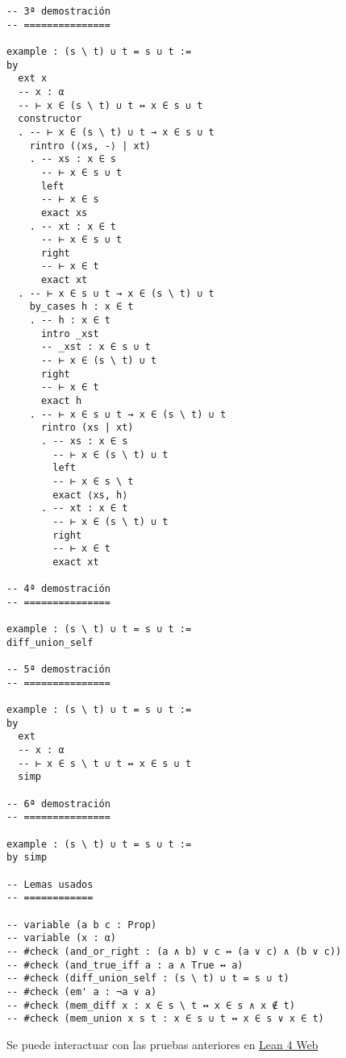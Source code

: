 \begin{verbatim}
-- 3ª demostración
-- ===============

example : (s \ t) ∪ t = s ∪ t :=
by
  ext x
  -- x : α
  -- ⊢ x ∈ (s \ t) ∪ t ↔ x ∈ s ∪ t
  constructor
  . -- ⊢ x ∈ (s \ t) ∪ t → x ∈ s ∪ t
    rintro (⟨xs, -⟩ | xt)
    . -- xs : x ∈ s
      -- ⊢ x ∈ s ∪ t
      left
      -- ⊢ x ∈ s
      exact xs
    . -- xt : x ∈ t
      -- ⊢ x ∈ s ∪ t
      right
      -- ⊢ x ∈ t
      exact xt
  . -- ⊢ x ∈ s ∪ t → x ∈ (s \ t) ∪ t
    by_cases h : x ∈ t
    . -- h : x ∈ t
      intro _xst
      -- _xst : x ∈ s ∪ t
      -- ⊢ x ∈ (s \ t) ∪ t
      right
      -- ⊢ x ∈ t
      exact h
    . -- ⊢ x ∈ s ∪ t → x ∈ (s \ t) ∪ t
      rintro (xs | xt)
      . -- xs : x ∈ s
        -- ⊢ x ∈ (s \ t) ∪ t
        left
        -- ⊢ x ∈ s \ t
        exact ⟨xs, h⟩
      . -- xt : x ∈ t
        -- ⊢ x ∈ (s \ t) ∪ t
        right
        -- ⊢ x ∈ t
        exact xt

-- 4ª demostración
-- ===============

example : (s \ t) ∪ t = s ∪ t :=
diff_union_self

-- 5ª demostración
-- ===============

example : (s \ t) ∪ t = s ∪ t :=
by
  ext
  -- x : α
  -- ⊢ x ∈ s \ t ∪ t ↔ x ∈ s ∪ t
  simp

-- 6ª demostración
-- ===============

example : (s \ t) ∪ t = s ∪ t :=
by simp

-- Lemas usados
-- ============

-- variable (a b c : Prop)
-- variable (x : α)
-- #check (and_or_right : (a ∧ b) ∨ c ↔ (a ∨ c) ∧ (b ∨ c))
-- #check (and_true_iff a : a ∧ True ↔ a)
-- #check (diff_union_self : (s \ t) ∪ t = s ∪ t)
-- #check (em' a : ¬a ∨ a)
-- #check (mem_diff x : x ∈ s \ t ↔ x ∈ s ∧ x ∉ t)
-- #check (mem_union x s t : x ∈ s ∪ t ↔ x ∈ s ∨ x ∈ t)
\end{verbatim}
Se puede interactuar con las pruebas anteriores en \href{https://lean.math.hhu.de/\#url=https://raw.githubusercontent.com/jaalonso/Calculemus2/main/src/Union\_con\_su\_diferencia.lean}{Lean 4 Web}


